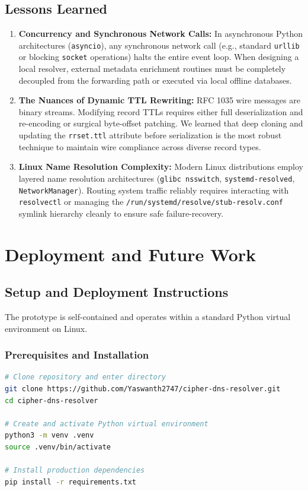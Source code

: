 \documentclass[10pt,a4paper]{article}
\begin{document}
\subsection{Lessons Learned}
\begin{enumerate}\itemsep 2pt
    \item \textbf{Concurrency and Synchronous Network Calls:} In asynchronous Python architectures (\texttt{asyncio}), any synchronous network call (e.g., standard \texttt{urllib} or blocking \texttt{socket} operations) halts the entire event loop. When designing a local resolver, external metadata enrichment routines must be completely decoupled from the forwarding path or executed via local offline databases.
    \item \textbf{The Nuances of Dynamic TTL Rewriting:} RFC 1035 wire messages are binary streams. Modifying record TTLs requires either full deserialization and re-encoding or surgical byte-offset patching. We learned that deep cloning and updating the \texttt{rrset.ttl} attribute before serialization is the most robust technique to maintain wire compliance across diverse record types.
    \item \textbf{Linux Name Resolution Complexity:} Modern Linux distributions employ layered name resolution architectures (\texttt{glibc nsswitch}, \texttt{systemd-resolved}, \texttt{NetworkManager}). Routing system traffic reliably requires interacting with \texttt{resolvectl} or managing the \texttt{/run/systemd/resolve/stub-resolv.conf} symlink hierarchy cleanly to ensure safe failure-recovery.
\end{enumerate}

\section{Deployment and Future Work}

\subsection{Setup and Deployment Instructions}
The prototype is self-contained and operates within a standard Python virtual environment on Linux.

\subsubsection{Prerequisites and Installation}
\begin{lstlisting}[language=bash, caption={Installation and Dependency Setup Commands}]
# Clone repository and enter directory
git clone https://github.com/Yaswanth2747/cipher-dns-resolver.git
cd cipher-dns-resolver

# Create and activate Python virtual environment
python3 -m venv .venv
source .venv/bin/activate

# Install production dependencies
pip install -r requirements.txt
\end{lstlisting}
\end{document}
